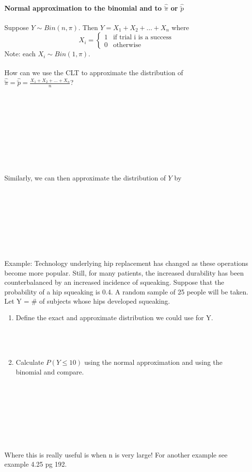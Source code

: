 \newpage

\large \textbf{Normal approximation to the binomial and to $\hat{\utilde{\pi}}$ or $\hat{\utilde{p}}$}\normalsize\\~\\
Suppose $Y\sim Bin(n,\pi)$. Then $Y=X_1+X_2+...+X_n$ where 
$$X_i =\begin{cases} 1 & \mbox{if trial i is a success}\\ 0 & \mbox{otherwise}
\end{cases}$$
Note: each $X_i\sim Bin(1,\pi)$.\\~\\
How can we use the CLT to approximate the distribution of $\hat{\utilde{\pi}}=\hat{\utilde{p}}=\frac{X_1+X_2+...+X_n}{n}$?\\~\\~\\~\\~\\~\\~\\~\\~\\~\\
Similarly, we can then approximate the distribution of $Y$ by\\~\\~\\~\\~\\~\\~\\~\\~\\
Example: Technology underlying hip replacement has changed as these operations become more popular. Still, for many patients, the increased durability has been counterbalanced by an increased incidence of squeaking. Suppose that the probability of a hip squeaking is 0.4. A random sample of 25 people will be taken.\\
Let Y = \# of subjects whose hips developed squeaking.
\begin{enumerate}
\item Define the exact and approximate distribution we could use for Y.\\~\\~\\~\\
\item Calculate $P(Y \leq 10)$ using the normal approximation and using the binomial and compare.\\~\\~\\~\\~\\~\\~\\~\\
\end{enumerate}
Where this is really useful is when n is very large! For another example see example 4.25 pg 192.


